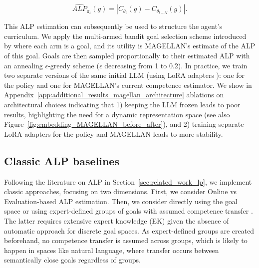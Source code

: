 \documentclass{article}
\begin{document}
\begin{equation}
    \hat{ALP}_{\pi_t}(g) = |C_{\theta_t}(g) - C_{\theta_{t-N}}(g)|.
\end{equation}

This ALP estimation can subsequently be used to structure the agent's curriculum. We apply the multi-armed bandit goal selection scheme introduced by \cite{lopes_strategic_2012} where each arm is a goal, and its utility is MAGELLAN's estimate of the ALP of this goal. Goals are then sampled proportionally to their estimated ALP with an annealing $\epsilon$-greedy scheme ($\epsilon$ decreasing from 1 to 0.2).
In practice, we train two separate versions of the same initial LLM (using LoRA adapters \cite{Hu2021LoRALA}): one for the policy and one for MAGELLAN's current competence estimator. We show in Appendix~\ref{app:additional_results_magellan_architecture} ablations on architectural choices indicating that 1) keeping the LLM frozen leads to poor results, highlighting the need for a dynamic representation space (see also Figure~\ref{fig:embedding_MAGELLAN_before_after}), and 2) training separate LoRA adapters for the policy and MAGELLAN leads to more stability.

\subsection{Classic ALP baselines} \label{sec:lp_baselines}
Following the literature on ALP in Section~\ref{sec:related_work_lp}, we implement classic approaches, focusing on two dimensions. First, we consider Online \cite{baranes_active_2013, matiisen_teacher-student_2017} vs Evaluation-based ALP \cite{kanitscheider_multi-task_2021, zhang_omni_2024} estimation. Then, we consider directly using the goal space \cite{portelas_teacher_2019,kanitscheider_multi-task_2021} or using expert-defined groups of goals with assumed competence transfer \cite{stout_competence_2010,colas_curious_2019}. The latter requires extensive expert knowledge (EK) given the absence of automatic approach for discrete goal spaces. As expert-defined groups are created beforehand, no competence transfer is assumed across groups, which is likely to happen in spaces like natural language, where transfer occurs between semantically close goals regardless of groups. 
\end{document}
